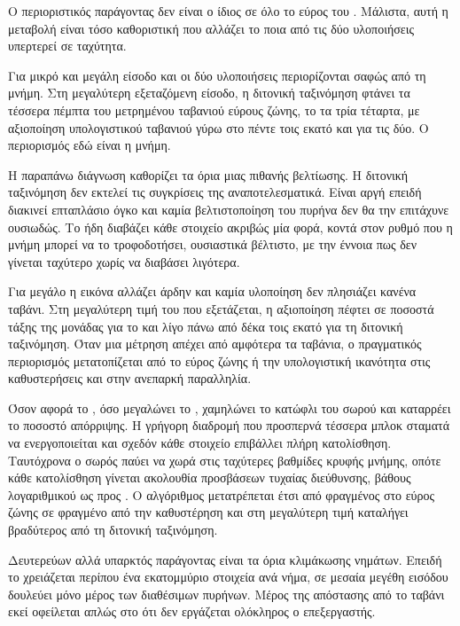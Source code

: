 Ο περιοριστικός παράγοντας δεν είναι ο ίδιος σε όλο το εύρος του .
Μάλιστα, αυτή η μεταβολή είναι τόσο καθοριστική που αλλάζει το ποια από τις δύο
υλοποιήσεις υπερτερεί σε ταχύτητα.

Για μικρό  και μεγάλη είσοδο και οι δύο υλοποιήσεις περιορίζονται σαφώς
από τη μνήμη. Στη μεγαλύτερη εξεταζόμενη είσοδο, η διτονική ταξινόμηση φτάνει
τα τέσσερα πέμπτα του μετρημένου ταβανιού εύρους ζώνης, το  τα
τρία τέταρτα, με αξιοποίηση υπολογιστικού ταβανιού γύρω στο πέντε τοις εκατό
και για τις δύο. Ο περιορισμός εδώ είναι η μνήμη.

Η παραπάνω διάγνωση καθορίζει τα όρια μιας πιθανής βελτίωσης. Η διτονική
ταξινόμηση δεν εκτελεί τις συγκρίσεις της αναποτελεσματικά. Είναι αργή επειδή
διακινεί επταπλάσιο όγκο και καμία βελτιστοποίηση του πυρήνα δεν θα την
επιτάχυνε ουσιωδώς. Το  ήδη διαβάζει κάθε στοιχείο ακριβώς μία
φορά, κοντά στον ρυθμό που η μνήμη μπορεί να το τροφοδοτήσει, ουσιαστικά
βέλτιστο, με την έννοια πως δεν γίνεται ταχύτερο χωρίς να διαβάσει λιγότερα.

Για μεγάλο  η εικόνα αλλάζει άρδην και καμία υλοποίηση δεν πλησιάζει
κανένα ταβάνι. Στη μεγαλύτερη τιμή του  που εξετάζεται, η αξιοποίηση
πέφτει σε ποσοστά τάξης της μονάδας για το  και λίγο πάνω από
δέκα τοις εκατό για τη διτονική ταξινόμηση. Όταν μια μέτρηση απέχει από
αμφότερα τα ταβάνια, ο πραγματικός περιορισμός μετατοπίζεται από το εύρος ζώνης
ή την υπολογιστική ικανότητα στις καθυστερήσεις και στην ανεπαρκή παραλληλία.

Όσον αφορά το , όσο μεγαλώνει το , χαμηλώνει το κατώφλι
του σωρού και καταρρέει το ποσοστό απόρριψης. Η γρήγορη διαδρομή που προσπερνά
τέσσερα μπλοκ σταματά να ενεργοποιείται και σχεδόν κάθε στοιχείο επιβάλλει
πλήρη κατολίσθηση. Ταυτόχρονα ο σωρός παύει να χωρά στις ταχύτερες βαθμίδες
κρυφής μνήμης, οπότε κάθε κατολίσθηση γίνεται ακολουθία προσβάσεων τυχαίας
διεύθυνσης, βάθους λογαριθμικού ως προς . Ο αλγόριθμος μετατρέπεται έτσι
από φραγμένος στο εύρος ζώνης σε φραγμένο από την καθυστέρηση και στη
μεγαλύτερη τιμή  καταλήγει βραδύτερος από τη διτονική ταξινόμηση.

Δευτερεύων αλλά υπαρκτός παράγοντας είναι τα όρια κλιμάκωσης νημάτων. Επειδή το
 χρειάζεται περίπου ένα εκατομμύριο στοιχεία ανά νήμα, σε μεσαία
μεγέθη εισόδου δουλεύει μόνο μέρος των διαθέσιμων πυρήνων. Μέρος της απόστασης
από το ταβάνι εκεί οφείλεται απλώς στο ότι δεν εργάζεται ολόκληρος ο
επεξεργαστής.
